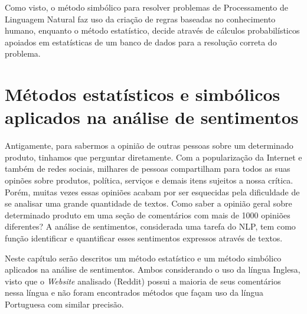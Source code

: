 Como visto, o método simbólico para resolver problemas de Processamento de
Linguagem Natural faz uso da criação de regras baseadas no conhecimento humano,
enquanto o método estatístico, decide através de cálculos probabilísticos
apoiados em estatísticas de um banco de dados para a resolução correta do
problema.


%
%
%

\chapter{Métodos estatísticos e simbólicos aplicados na análise de sentimentos}
\label{cap:Classificadores}

Antigamente, para sabermos a opinião de outras pessoas sobre um
determinado produto, tinhamos que perguntar diretamente. Com a
popularização da Internet e também de redes sociais, milhares de pessoas
compartilham para todos as suas opinões sobre produtos, política, serviços e
demais itens sujeitos a nossa crítica. Porém, muitas vezes essas opiniões acabam
por ser esquecidas pela dificuldade de se analisar uma grande quantidade de
textos. Como saber a opinião geral sobre determinado produto em uma seção de
comentários com mais de 1000 opiniões diferentes? A análise de sentimentos,
considerada uma tarefa do \ac{NLP}, tem como função identificar e quantificar
esses sentimentos expressos através de textos.

Neste capítulo serão descritos um método estatístico e um método simbólico
aplicados na análise de sentimentos. Ambos considerando o uso da língua Inglesa,
visto que o \textit{Website} analisado (Reddit) possui a maioria de seus
comentários nessa língua e não foram encontrados métodos que façam uso da língua
Portuguesa com similar precisão.



